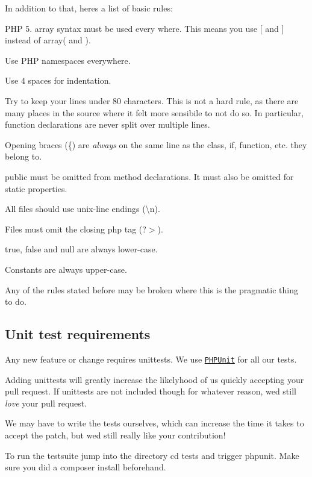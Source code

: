 In addition to that, here\textquotesingle{}s a list of basic rules\+:


\begin{DoxyEnumerate}
\item P\+HP 5. array syntax must be used every where. This means you use {\ttfamily \mbox{[}} and {\ttfamily \mbox{]}} instead of {\ttfamily array(} and {\ttfamily )}.
\item Use P\+HP namespaces everywhere.
\item Use 4 spaces for indentation.
\item Try to keep your lines under 80 characters. This is not a hard rule, as there are many places in the source where it felt more sensibile to not do so. In particular, function declarations are never split over multiple lines.
\item Opening braces ({\ttfamily \{}) are {\itshape always} on the same line as the {\ttfamily class}, {\ttfamily if}, {\ttfamily function}, etc. they belong to.
\item {\ttfamily public} must be omitted from method declarations. It must also be omitted for static properties.
\item All files should use unix-\/line endings ({\ttfamily \textbackslash{}n}).
\item Files must omit the closing php tag ({\ttfamily ?$>$}).
\item {\ttfamily true}, {\ttfamily false} and {\ttfamily null} are always lower-\/case.
\item Constants are always upper-\/case.
\item Any of the rules stated before may be broken where this is the pragmatic thing to do.
\end{DoxyEnumerate}

\subsection*{Unit test requirements }

Any new feature or change requires unittests. We use \href{http://phpunit.de/}{\tt P\+H\+P\+Unit} for all our tests.

Adding unittests will greatly increase the likelyhood of us quickly accepting your pull request. If unittests are not included though for whatever reason, we\textquotesingle{}d still {\itshape love} your pull request.

We may have to write the tests ourselves, which can increase the time it takes to accept the patch, but we\textquotesingle{}d still really like your contribution!

To run the testsuite jump into the directory {\ttfamily cd tests} and trigger {\ttfamily phpunit}. Make sure you did a {\ttfamily composer install} beforehand. 